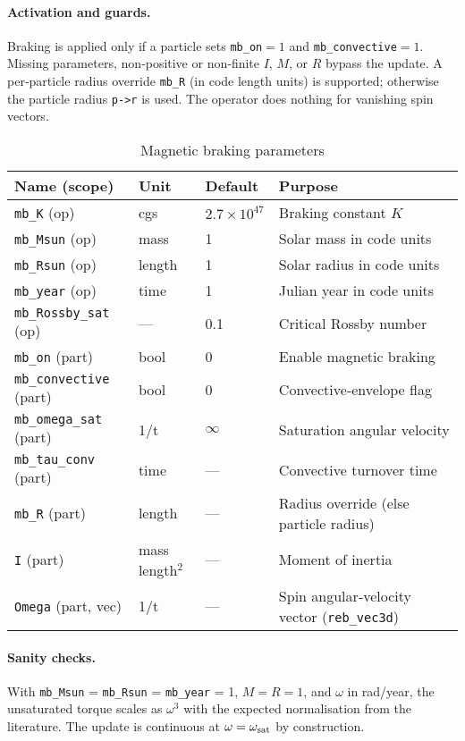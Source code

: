 \documentclass[11pt]{article}
\begin{document}
\paragraph{Activation and guards.}
Braking is applied only if a particle sets \texttt{mb\_on}$=1$ and
\texttt{mb\_convective}$=1$. Missing parameters, non‑positive or non‑finite
$I$, $M$, or $R$ bypass the update. A per‑particle radius override
\texttt{mb\_R} (in code length units) is supported; otherwise the particle
radius \texttt{p->r} is used. The operator does nothing for vanishing spin
vectors.

\begin{table}[h]
\centering\footnotesize
\caption{Magnetic braking parameters}
\label{tab:mb}
\begin{tabular}{@{}llll@{}}
\toprule
Name (scope) & Unit & Default & Purpose \\
\midrule
\texttt{mb\_K} (op) & cgs & $2.7\times10^{47}$ & Braking constant $K$\\
\texttt{mb\_Msun} (op) & mass & 1 & Solar mass in code units\\
\texttt{mb\_Rsun} (op) & length & 1 & Solar radius in code units\\
\texttt{mb\_year} (op) & time & 1 & Julian year in code units\\
\texttt{mb\_Rossby\_sat} (op) & — & 0.1 & Critical Rossby number\\
\texttt{mb\_on} (part) & bool & 0 & Enable magnetic braking\\
\texttt{mb\_convective} (part) & bool & 0 & Convective‑envelope flag\\
\texttt{mb\_omega\_sat} (part) & 1/t & $\infty$ & Saturation angular velocity\\
\texttt{mb\_tau\_conv} (part) & time & — & Convective turnover time\\
\texttt{mb\_R} (part) & length & — & Radius override (else particle radius)\\
\texttt{I} (part) & mass\,length$^2$ & — & Moment of inertia\\
\texttt{Omega} (part, vec) & 1/t & — & Spin angular‑velocity vector (\texttt{reb\_vec3d})\\
\bottomrule
\end{tabular}
\end{table}

\paragraph{Sanity checks.}
With \texttt{mb\_Msun} = \texttt{mb\_Rsun} = \texttt{mb\_year} = 1, $M=R=1$,
and $\omega$ in rad/year, the unsaturated torque scales as $\omega^3$ with the
expected normalisation from the literature. The update is continuous at
$\omega=\omega_{\rm sat}$ by construction.
\end{document}

